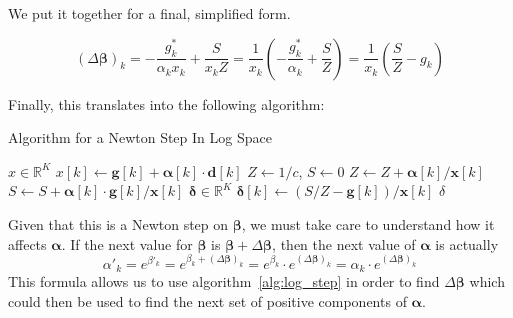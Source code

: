 \documentclass[twoside]{article}
\begin{document}
We put it together for a final, simplified form.

\[
\left({\Delta \boldsymbol{\beta}}\right)_k = - \frac{{g}^*_k}{{\alpha}_k{x}_k} + \frac{S}{{x}_k Z} = \frac{1}{{x}_k}\left(- \frac{{g}^*_k}{{\alpha}_k} + \frac{S}{Z}\right)= \frac{1}{{x}_k}\left(\frac{S}{Z} - {g}_k\right)
\]

Finally, this translates into the following algorithm:

\begin{algorithm}
  \caption{Algorithm for a Newton Step In Log Space}
  \begin{algorithmic}
  \State $x \in \mathbb{R}^{K}$
    \State $x[k] \gets \mathbf{g}[k]+\mathbf{\alpha}[k] \cdot \mathbf{d}[k]$
  \EndFor
  \State $Z \gets 1/c$, $S \gets 0$
    \State $Z \gets Z + \mathbf{\alpha}[k] / \mathbf{x}[k]$
    \State $S \gets S + \mathbf{\alpha}[k] \cdot \mathbf{g}[k]/\mathbf{x}[k]$
  \EndFor
  \State $\mathbf{\delta} \in \mathbb{R}^{K}$
    \State $\mathbf{\delta}[k] \gets (S / Z - \mathbf{g}[k]) / \mathbf{x}[k]$ \EndFor
  \State \Return $\delta$
  \EndFunction
  \end{algorithmic}
  \label{alg:log_step}
\end{algorithm}

Given that this is a Newton step on $\boldsymbol{\beta}$, we must take care to understand how it affects $\boldsymbol{\alpha}$. If the next value for $\boldsymbol{\beta}$ is $\boldsymbol{\beta} + \Delta \boldsymbol{\beta}$, then the next value of $\boldsymbol{\alpha}$ is actually
\[
{\alpha}'_k = e^{{\beta}'_k} = e^{{\beta}_k + \left(\Delta \boldsymbol{\beta}\right)_k} = e^{{\beta}_k} \cdot e^{\left(\Delta \boldsymbol{\beta}\right)_k} = {\alpha}_k \cdot e^{\left(\Delta \boldsymbol{\beta}\right)_k}  
\]
This formula allows us to use algorithm~\ref{alg:log_step} in order to find $\Delta \boldsymbol{\beta}$ which could then be used to find the next set of positive components of $\boldsymbol{\alpha}$.
\end{document}
